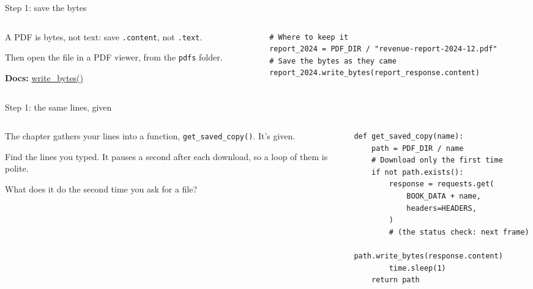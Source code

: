 \documentclass[9pt,aspectratio=169]{beamer}
\begin{document}
\begin{frame}[fragile]{Step 1: save the bytes}
    \begin{columns}[T]
        \begin{column}{0.37\textwidth}
            A PDF is bytes, not text: save \texttt{.content}, not \texttt{.text}.

            \medskip
            Then open the file in a PDF viewer, from the \texttt{pdfs} folder.

            \medskip
            {\scriptsize\textbf{Docs:} \href{https://docs.python.org/3/library/pathlib.html\#pathlib.Path.write_bytes}{write\_bytes()}\par}
        \end{column}
        \begin{column}{0.6\textwidth}
\begin{lstlisting}
# Where to keep it
report_2024 = PDF_DIR / "revenue-report-2024-12.pdf"
# Save the bytes as they came
report_2024.write_bytes(report_response.content)
\end{lstlisting}
        \end{column}
    \end{columns}
\end{frame}

\begin{frame}[fragile]{Step 1: the same lines, given}
    \begin{columns}[T]
        \begin{column}{0.37\textwidth}
            The chapter gathers your lines into a function, \texttt{get\_saved\_copy()}. It's given.

            \medskip
            Find the lines you typed. It pauses a second after each download, so a loop of them is polite.

            \medskip
            What does it do the second time you ask for a file?
        \end{column}
        \begin{column}{0.6\textwidth}
\begin{lstlisting}
def get_saved_copy(name):
    path = PDF_DIR / name
    # Download only the first time
    if not path.exists():
        response = requests.get(
            BOOK_DATA + name,
            headers=HEADERS,
        )
        # (the status check: next frame)
        path.write_bytes(response.content)
        time.sleep(1)
    return path
\end{lstlisting}
        \end{column}
    \end{columns}
\end{frame}
\end{document}
